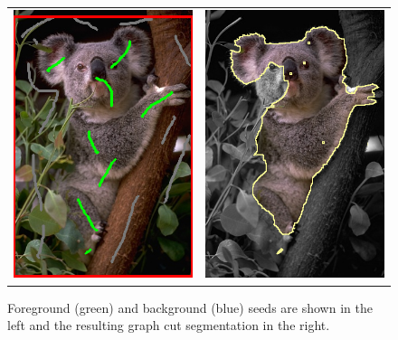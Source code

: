 \begin{figure}
\centering
\begin{tabular}{cc}
\includegraphics[scale=0.4]{figures/chapter9/segmentation/seeds.png} &
\includegraphics[scale=0.4]{figures/chapter9/segmentation/gc-seg.png}
\end{tabular}
\caption{Foreground (green) and background (blue) seeds are shown in the left and the resulting graph cut segmentation in the right.}
\label{ch9:fig:grabcut-input-image-segmentation}
\end{figure}

